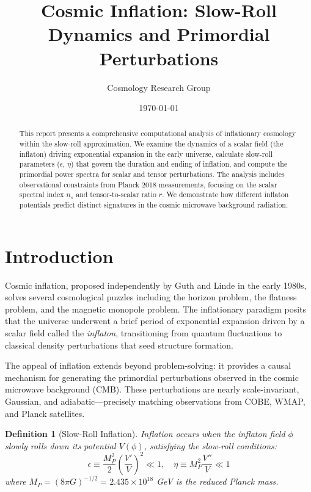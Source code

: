 \documentclass[a4paper, 11pt]{article}
\title{Cosmic Inflation: Slow-Roll Dynamics and Primordial Perturbations}
\author{Cosmology Research Group}
\date{\today}
\newtheorem{definition}{Definition}[section]
\begin{document}
\maketitle

\begin{abstract}
This report presents a comprehensive computational analysis of inflationary cosmology within
the slow-roll approximation. We examine the dynamics of a scalar field (the inflaton) driving
exponential expansion in the early universe, calculate slow-roll parameters ($\epsilon$, $\eta$)
that govern the duration and ending of inflation, and compute the primordial power spectra for
scalar and tensor perturbations. The analysis includes observational constraints from Planck 2018
measurements, focusing on the scalar spectral index $n_s$ and tensor-to-scalar ratio $r$. We
demonstrate how different inflaton potentials predict distinct signatures in the cosmic microwave
background radiation.
\end{abstract}

\section{Introduction}

Cosmic inflation, proposed independently by Guth and Linde in the early 1980s, solves several
cosmological puzzles including the horizon problem, the flatness problem, and the magnetic monopole
problem. The inflationary paradigm posits that the universe underwent a brief period of exponential
expansion driven by a scalar field called the \textit{inflaton}, transitioning from quantum
fluctuations to classical density perturbations that seed structure formation.

The appeal of inflation extends beyond problem-solving: it provides a causal mechanism for
generating the primordial perturbations observed in the cosmic microwave background (CMB). These
perturbations are nearly scale-invariant, Gaussian, and adiabatic—precisely matching observations
from COBE, WMAP, and Planck satellites.

\begin{definition}[Slow-Roll Inflation]
Inflation occurs when the inflaton field $\phi$ slowly rolls down its potential $V(\phi)$,
satisfying the slow-roll conditions:
\begin{equation}
\epsilon \equiv \frac{M_P^2}{2}\left(\frac{V'}{V}\right)^2 \ll 1, \quad
\eta \equiv M_P^2 \frac{V''}{V} \ll 1
\end{equation}
where $M_P = (8\pi G)^{-1/2} = 2.435 \times 10^{18}$ GeV is the reduced Planck mass.
\end{definition}
\end{document}
